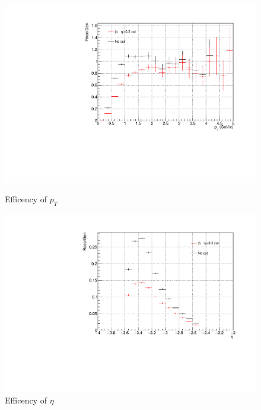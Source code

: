             \begin{figure}[htbp]
                \centering
                \begin{minipage}{0.45\textwidth}
                    \centering
                    \includegraphics[width=\textwidth]{fig/3_5_6_efficiency_pt.pdf}
                    \caption{Efficency of $p_T$}
                    \label{Efficency_of_pt}
                \end{minipage}
                \hfill
                \begin{minipage}{0.45\textwidth}
                \centering
                    \includegraphics[width=\textwidth]{fig/3_5_6_efficiency_eta.pdf}
                    \caption{Efficency of $\eta$}
                    \label{Efficency_of_eta}
                \end{minipage}

\end{figure}
